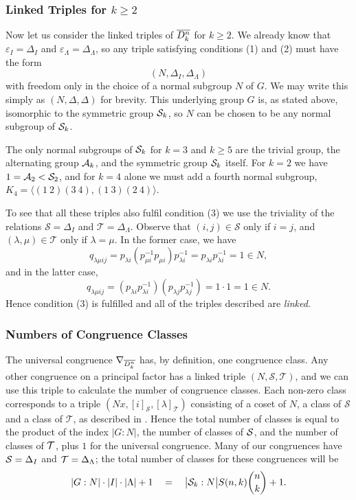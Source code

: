 \subsubsection{Linked Triples for $k \geq 2$}
\label{sec:k2}
Now let us consider the linked triples of $\overline{D_k^n}$ for $k \geq 2$.  We already
know that $\varepsilon_I = \Delta_I$ and $\varepsilon_\Lambda = \Delta_\Lambda$,
so any triple satisfying conditions (1) and (2) must have the form
$$(N, \Delta_I, \Delta_\Lambda)$$
with freedom only in the choice of a normal subgroup $N$ of $G$.  We may write
this simply as $(N, \Delta, \Delta)$ for brevity.  This
underlying group $G$ is, as stated above, isomorphic to the symmetric group
$\mathcal{S}_k$, so $N$ can be chosen to be any normal subgroup of $\mathcal{S}_k$.

The only normal subgroups of $\mathcal{S}_k$ for $k=3$ and $k \geq 5$ are the trivial group, the
alternating group $\mathcal{A}_k$, and the symmetric group $\mathcal{S}_k$ itself.  For $k=2$ we
have $1 = \mathcal{A}_2 < \mathcal{S}_2$, and for $k=4$ alone we must add a fourth normal subgroup,
$K_4 = \langle (1~2)(3~4), (1~3)(2~4) \rangle$.

To see that all these triples also fulfil condition (3) we use the triviality of
the relations $\mathcal{S} = \Delta_I$ and $\mathcal{T} = \Delta_\Lambda$.
Observe that $(i,j) \in \mathcal{S}$ only if $i = j$, and $(\lambda,\mu) \in
\mathcal{T}$ only if $\lambda = \mu$.  In the former case, we have
$$q_{\lambda \mu i j} = p_{\lambda i} (p_{\mu i}^{-1} p_{\mu i}) p_{\lambda
  i}^{-1} = p_{\lambda i} p_{\lambda i}^{-1} = 1 \in N,$$
and in the latter case,
$$q_{\lambda \mu i j} = (p_{\lambda i} p_{\lambda i}^{-1}) (p_{\lambda j}
p_{\lambda j}^{-1}) = 1 \cdot 1 = 1 \in N.$$ Hence condition (3) is fulfilled
and all of the triples described are \textit{linked}.

\subsubsection{Numbers of Congruence Classes}
\label{sec:nrclasses}
The universal congruence $\nabla_{\overline{D_k^n}}$ has, by definition, one
congruence class.  Any other congruence on a principal factor has a linked
triple $(N,\mathcal{S},\mathcal{T})$, and we can use this triple to calculate
the number of congruence classes.  Each non-zero class corresponds to a triple
$(Nx,[i]_\mathcal{S},[\lambda]_\mathcal{T})$ consisting of a coset of $N$, a
class of $\mathcal{S}$ and a class of $\mathcal{T}$, as described in
\cite[Theorem 3.2]{mtorpey_pre_msc}.  Hence the total number of classes is equal
to the product of the index $|G:N|$, the number of classes of $\mathcal{S}$, and the
number of classes of $\mathcal{T}$, plus $1$ for the universal congruence.  Many of our
congruences have $\mathcal{S}=\Delta_I$ and $\mathcal{T}=\Delta_\Lambda$; the total number of
classes for these congruences will be
$$|G:N| \cdot |I| \cdot |\Lambda| + 1
\quad=\quad \big|\mathcal{S}_k:N\big| S(n,k) \binom{n}{k} + 1.$$

